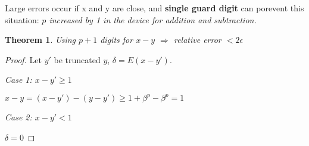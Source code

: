 \documentclass{article}
\newtheorem{theorem}{Theorem}
\begin{document}
        Large errors occur if x and y are close, and \textbf{single guard digit}
        can porevent this situation:
        {\it $p$ increased by 1 in the device for addition and subtraction.}

        
        \begin{theorem}
            Using $p+1$ digits for $x-y$ $\Rightarrow$ relative error $ < 2\epsilon$
        \end{theorem}

        \begin{proof}
            Let $y'$ be truncated $y$, $\delta = E(x - y')$.

            \emph{Case 1: $x - y' \geq 1$}

                $x - y = (x - y') - (y - y') \geq 1 + \beta^p - \beta^p = 1$

            \emph{Case 2: $x - y' < 1$}

                $\delta = 0$

        \end{proof}

        
\end{document}
